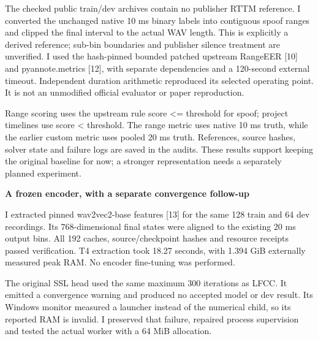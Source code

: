 \documentclass[10pt,a4paper]{article}
\newcommand{\reporttitle}[1]{{\color{navy}\Large\bfseries #1}\par\vspace{5pt}}
\begin{document}
\par

The checked public train/dev archives contain no publisher RTTM reference. I converted the unchanged native 10 ms binary labels into contiguous spoof ranges and clipped the final interval to the actual WAV length. This is explicitly a derived reference; sub-bin boundaries and publisher silence treatment are unverified. I used the hash-pinned bounded patched upstream RangeEER [10] and pyannote.metrics [12], with separate dependencies and a 120-second external timeout. Independent duration arithmetic reproduced its selected operating point. It is not an unmodified official evaluator or paper reproduction.\par

{\small Range scoring uses the upstream rule score <= threshold for spoof; project timelines use score < threshold. The range metric uses native 10 ms truth, while the earlier custom metric uses pooled 20 ms truth. References, source hashes, solver state and failure logs are saved in the audits. These results support keeping the original baseline for now; a stronger representation needs a separately planned experiment.}\par

\clearpage

\reporttitle{A frozen encoder, with a separate convergence follow-up}

I extracted pinned wav2vec2-base features [13] for the same 128 train and 64 dev recordings. Its 768-dimensional final states were aligned to the existing 20 ms output bins. All 192 caches, source/checkpoint hashes and resource receipts passed verification. T4 extraction took 18.27 seconds, with 1.394 GiB externally measured peak RAM. No encoder fine-tuning was performed.\par

\par

The original SSL head used the same maximum 300 iterations as LFCC. It emitted a convergence warning and produced no accepted model or dev result. Its Windows monitor measured a launcher instead of the numerical child, so its reported RAM is invalid. I preserved that failure, repaired process supervision and tested the actual worker with a 64 MiB allocation.\par
\end{document}

